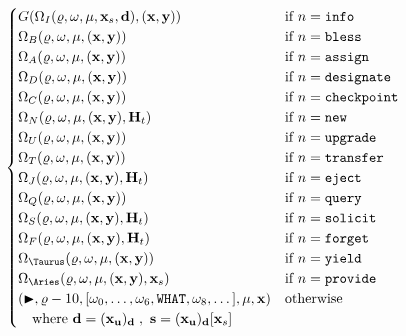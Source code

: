 \begin{align}
\begin{cases}
    G(\Omega_I(\gascounter, \registers, \memory, \mathbf{x}_s, \mathbf{d}), (\mathbf{x}, \mathbf{y})) &\when n = \mathtt{info} \\
    \Omega_B(\gascounter, \registers, \memory, (\mathbf{x}, \mathbf{y})) &\when n = \mathtt{bless}\\
    \Omega_A(\gascounter, \registers, \memory, (\mathbf{x}, \mathbf{y})) &\when n = \mathtt{assign}\\
    \Omega_D(\gascounter, \registers, \memory, (\mathbf{x}, \mathbf{y})) &\when n = \mathtt{designate}\\
    \Omega_C(\gascounter, \registers, \memory, (\mathbf{x}, \mathbf{y})) &\when n = \mathtt{checkpoint} \\
    \Omega_N(\gascounter, \registers, \memory, (\mathbf{x}, \mathbf{y}), \mathbf{H}_t) &\when n = \mathtt{new} \\
    \Omega_U(\gascounter, \registers, \memory, (\mathbf{x}, \mathbf{y})) &\when n = \mathtt{upgrade} \\
    \Omega_T(\gascounter, \registers, \memory, (\mathbf{x}, \mathbf{y})) &\when n = \mathtt{transfer} \\
    \Omega_J(\gascounter, \registers, \memory, (\mathbf{x}, \mathbf{y}), \mathbf{H}_t) &\when n = \mathtt{eject} \\
    \Omega_Q(\gascounter, \registers, \memory, (\mathbf{x}, \mathbf{y})) &\when n = \mathtt{query} \\
    \Omega_S(\gascounter, \registers, \memory, (\mathbf{x}, \mathbf{y}), \mathbf{H}_t) &\when n = \mathtt{solicit} \\
    \Omega_F(\gascounter, \registers, \memory, (\mathbf{x}, \mathbf{y}), \mathbf{H}_t) &\when n = \mathtt{forget} \\
    \Omega_\Taurus(\gascounter, \registers, \memory, (\mathbf{x}, \mathbf{y})) &\when n = \mathtt{yield} \\
    \Omega_\Aries(\gascounter, \registers, \memory, (\mathbf{x}, \mathbf{y}), \mathbf{x}_s) &\when n = \mathtt{provide} \\
    (\continue, \gascounter - 10, [\registers_0, \dots, \registers_6, \mathtt{WHAT}, \registers_8, \dots], \memory, \mathbf{x}) &\otherwise\\
    \quad \where \mathbf{d} = (\mathbf{x}_\mathbf{u})_\mathbf{d}\;,\ \mathbf{s} = (\mathbf{x}_\mathbf{u})_\mathbf{d}[\mathbf{x}_s]\!\!\!\!\!\!\!\!\!\!\!\!\!\!\!\!\!& \\
  \end{cases} \\

\end{align}
